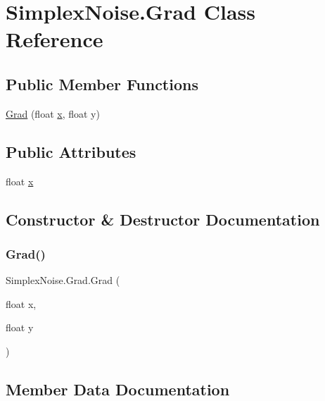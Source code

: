 \hypertarget{class_simplex_noise_1_1_grad}{}\section{Simplex\+Noise.\+Grad Class Reference}
\label{class_simplex_noise_1_1_grad}
\subsection*{Public Member Functions}
\begin{DoxyCompactItemize}
\item 
\mbox{\hyperlink{class_simplex_noise_1_1_grad_a079ab55e913e9e7a152bddede45dfa55}{Grad}} (float \mbox{\hyperlink{class_simplex_noise_1_1_grad_a623740b94dbbf25b8fd4df3a14ed6cc5}{x}}, float y)
\end{DoxyCompactItemize}
\subsection*{Public Attributes}
\begin{DoxyCompactItemize}
\item 
float \mbox{\hyperlink{class_simplex_noise_1_1_grad_a623740b94dbbf25b8fd4df3a14ed6cc5}{x}}
\end{DoxyCompactItemize}


\subsection{Constructor \& Destructor Documentation}
\mbox{\label{class_simplex_noise_1_1_grad_a079ab55e913e9e7a152bddede45dfa55}} 
\subsubsection{\texorpdfstring{Grad()}{Grad()}}
{\footnotesize\ttfamily Simplex\+Noise.\+Grad.\+Grad (\begin{DoxyParamCaption}\item[{float}]{x,  }\item[{float}]{y }\end{DoxyParamCaption})}



\subsection{Member Data Documentation}
\mbox{\label{class_simplex_noise_1_1_grad_a623740b94dbbf25b8fd4df3a14ed6cc5}} 

